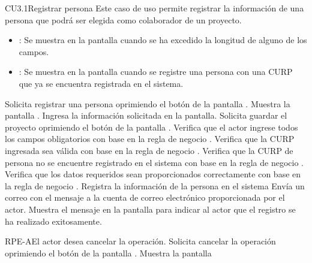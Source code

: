 \begin{UseCase}{CU3.1}{Registrar persona}{
	Este caso de uso permite registrar la información de una persona que podrá ser elegida como colaborador de un proyecto.
	}
{\begin{itemize}
		\item {}: Se muestra en la pantalla  cuando se ha excedido la longitud de alguno de los campos.
		\item {}: Se muestra en la pantalla  cuando se registre una persona con una CURP que ya se encuentra registrada en el sistema.
		\end{itemize}
		}
	\end{UseCase}
	\begin{UCtrayectoria}
		\UCpaso[\UCactor] Solicita registrar una persona oprimiendo el botón  de la pantalla .
		\UCpaso[\UCsist] Muestra la pantalla .
		\UCpaso[\UCactor] Ingresa la información solicitada en la pantalla. \label{CU3.1-P3}
		\UCpaso[\UCactor] Solicita guardar el proyecto oprimiendo el botón  de la pantalla . 
		\UCpaso[\UCsist] Verifica que el actor ingrese todos los campos obligatorios con base en la regla de negocio . 
		\UCpaso[\UCsist] Verifica que la CURP ingresada sea válida con base en la regla de negocio . 
		\UCpaso[\UCsist] Verifica que la CURP de persona no se encuentre registrado en el sistema con base en la regla de negocio . 
		\UCpaso[\UCsist] Verifica que los datos requeridos sean proporcionados correctamente con base en la regla de negocio .  
		\UCpaso[\UCsist] Registra la información de la persona en el sistema
		\UCpaso[\UCsist] Envía un correo con el mensaje  a la cuenta de correo electrónico proporcionada por el actor.
		\UCpaso[\UCsist] Muestra el mensaje  en la pantalla  para indicar al actor que el registro se ha realizado exitosamente.
	\end{UCtrayectoria}		
		\begin{UCtrayectoriaA}{RPE-A}{El actor desea cancelar la operación.}
			\UCpaso[\UCactor] Solicita cancelar la operación oprimiendo el botón  de la pantalla .
			\UCpaso[\UCsist] Muestra la pantalla 
		\end{UCtrayectoriaA}

